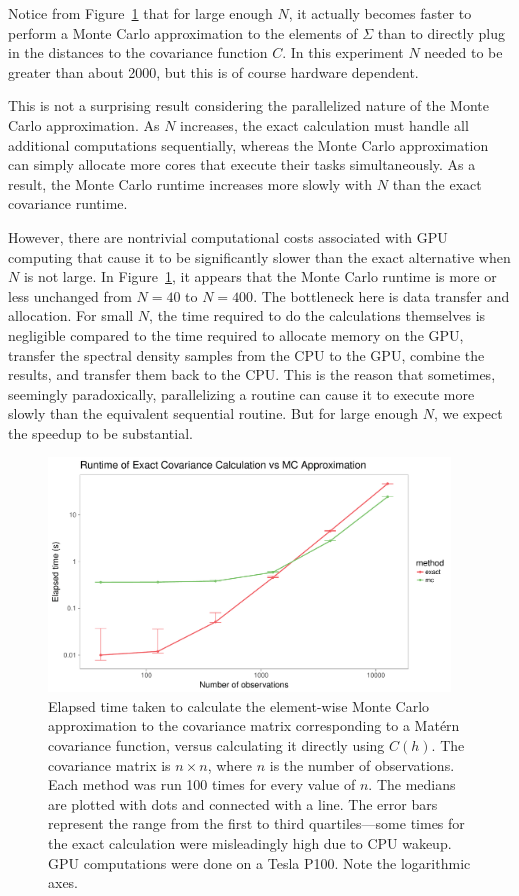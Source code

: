 \documentclass[12pt]{article}
\begin{document}
Notice from Figure~\ref{fig:timings-mc} that for large enough $N$, it actually becomes faster to perform a Monte Carlo approximation to the elements of $\Sigma$ than to directly plug in the distances to the covariance function $C$. In this experiment $N$ needed to be greater than about 2000, but this is of course hardware dependent.

This is not a surprising result considering the parallelized nature of the Monte Carlo approximation. As $N$ increases, the exact calculation must handle all additional computations sequentially, whereas the Monte Carlo approximation can simply allocate more cores that execute their tasks simultaneously. As a result, the Monte Carlo runtime increases more slowly with $N$ than the exact covariance runtime.

However, there are nontrivial computational costs associated with GPU computing that cause it to be significantly slower than the exact alternative when $N$ is not large. In Figure~\ref{fig:timings-mc}, it appears that the Monte Carlo runtime is more or less unchanged from $N = 40$ to $N = 400$. The bottleneck here is data transfer and allocation. For small $N$, the time required to do the calculations themselves is negligible compared to the time required to allocate memory on the GPU, transfer the spectral density samples from the CPU to the GPU, combine the results, and transfer them back to the CPU. This is the reason that sometimes, seemingly paradoxically, parallelizing a routine can cause it to execute more slowly than the equivalent sequential routine. But for large enough $N$, we expect the speedup to be substantial.

\begin{figure}[htbp]
  \centering
  \includegraphics[width=0.95\textwidth]{timings_mc.pdf}
  \caption{Elapsed time taken to calculate the element-wise Monte Carlo approximation to the covariance matrix corresponding to a Mat\'ern covariance function, versus calculating it directly using $C(h)$. The covariance matrix is $n \times n$, where $n$ is the number of observations. Each method was run 100 times for every value of $n$. The medians are plotted with dots and connected with a line. The error bars represent the range from the first to third quartiles---some times for the exact calculation were misleadingly high due to CPU wakeup. GPU computations were done on a Tesla P100. Note the logarithmic axes.}
  \label{fig:timings-mc}
\end{figure}
\end{document}
